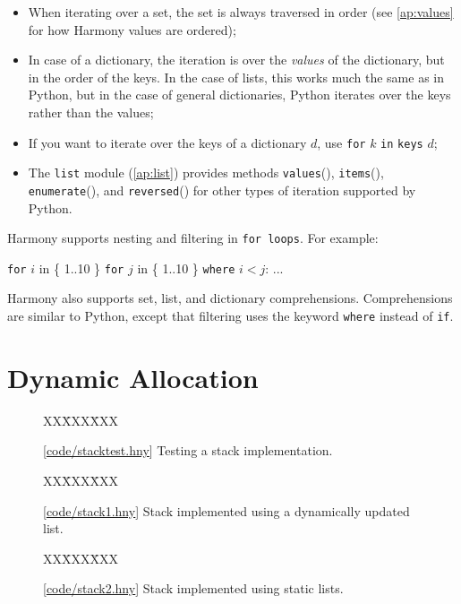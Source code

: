 \documentclass{report}
\newcommand{\harmonysource}[1]{
\begin{tabbing}
XX\=XXX\=XXX\kill
    
\end{tabbing}
}
\newcommand{\harmonylink}[1]{%
[\href{https://harmony.cs.cornell.edu/#1}{\underline{#1}}]%
}
\newenvironment{code}{
\tcolorbox
}{
\endtcolorbox
}
\begin{document}
\begin{itemize}
\item When iterating over a set, the set is always traversed in order
(see \autoref{ap:values} for how Harmony values are ordered);
\item In case of a dictionary, the iteration is over the \emph{values} of the
dictionary, but in the order of the keys.  In the case of lists, this
works much the same as in Python, but in the case of general dictionaries,
Python iterates over the keys rather than the values;
\item If you want to iterate over the keys of a dictionary $d$, use
\texttt{for} $k$ \texttt{in} \texttt{keys} $d$;
\item The \texttt{list} module (\autoref{ap:list}) provides methods \texttt{values}(),
\texttt{items}(), \texttt{enumerate}(), and \texttt{reversed}() for
other types of iteration supported by Python.
\end{itemize}

Harmony supports nesting and filtering in \texttt{for loops}.
For example:
\begin{code}
\texttt{for} $i$ in \{ 1..10 \}
\texttt{for} $j$ in \{ 1..10 \}
\texttt{where} $i < j$: ...
\end{code}

Harmony also supports set, list, and dictionary comprehensions.
%
Comprehensions are similar to Python, except that filtering uses
the keyword \texttt{where} instead of \texttt{if}.

\section{Dynamic Allocation}

\begin{figure}
\begin{code}
\harmonysource{stacktest}
\end{code}
\caption{\harmonylink{code/stacktest.hny} Testing a stack implementation.}
\label{fig:stacktest}
\end{figure}

\begin{figure}
\begin{code}
\harmonysource{stack1}
\end{code}
\caption{\harmonylink{code/stack1.hny} Stack implemented using a dynamically updated list.}
\label{fig:stack1}
\end{figure}

\begin{figure}
\begin{code}
\harmonysource{stack2}
\end{code}
\caption{\harmonylink{code/stack2.hny} Stack implemented using static lists.}
\label{fig:stack2}
\end{figure}
\end{document}
